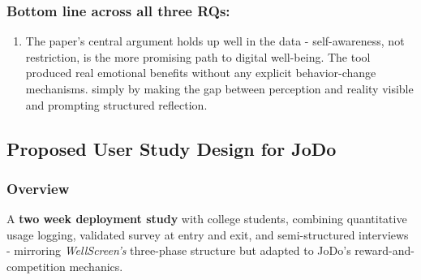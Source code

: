 \documentclass[12pt]{article}
\begin{document}
\subsubsection{Bottom line across all three RQs: }
\begin{enumerate}
    \item The paper's central argument holds up well in the data - self-awareness, not restriction, is the more promising path to digital well-being. The tool produced real emotional benefits without any explicit behavior-change mechanisms. simply by making the gap between perception and reality visible and prompting structured reflection.
\end{enumerate}
\subsection{Proposed User Study Design for JoDo}
\subsubsection{Overview}
A \textbf{two week deployment study} with college students, combining quantitative usage logging, validated survey at entry and exit, and semi-structured interviews - mirroring \textit{WellScreen's} three-phase structure but adapted to JoDo's reward-and-competition mechanics. 
\end{document}

